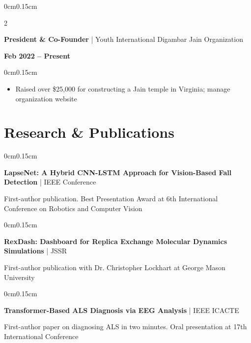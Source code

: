 \documentclass[10pt, letterpaper]{article}
\newenvironment{highlights}{
    \begin{itemize}[topsep=0pt, parsep=0pt, partopsep=0pt, itemsep=0pt, leftmargin=0.4cm]
}{
    \end{itemize}
}
\newenvironment{onecolentry}{
    \begin{adjustwidth}{0cm}{0.15cm}
}{
    \end{adjustwidth}
}
\newenvironment{twocolentry}[2][]{
    \onecolentry
    \def\secondColumn{#2}
    \setcolumnwidth{\fill, 4cm}
    \begin{paracol}{2}
}{
    \switchcolumn \raggedleft \secondColumn
    \end{paracol}
    \endonecolentry
}
\begin{document}
    \vspace{0.05cm}

    \begin{twocolentry}{\textbf{Feb 2022 -- Present}}
        \textbf{President \& Co-Founder} | Youth International Digambar Jain Organization
    \end{twocolentry}

    \begin{onecolentry}
        \begin{highlights}
            \item Raised over \$25,000 for constructing a Jain temple in Virginia; manage organization website
        \end{highlights}
    \end{onecolentry}

    \vspace{0.05cm}
    \section{Research \& Publications}
    \vspace{0.05cm}

    \begin{onecolentry}
        \textbf{LapseNet: A Hybrid CNN-LSTM Approach for Vision-Based Fall Detection} | IEEE Conference
        
        \vspace{0.05cm}
        First-author publication. Best Presentation Award at 6th International Conference on Robotics and Computer Vision
    \end{onecolentry}

    \vspace{0.1cm}

    \begin{onecolentry}
        \textbf{RexDash: Dashboard for Replica Exchange Molecular Dynamics Simulations} | JSSR
        
        \vspace{0.05cm}
        First-author publication with Dr. Christopher Lockhart at George Mason University
    \end{onecolentry}

    \vspace{0.1cm}

    \begin{onecolentry}
        \textbf{Transformer-Based ALS Diagnosis via EEG Analysis} | IEEE ICACTE
        
        \vspace{0.05cm}
        First-author paper on diagnosing ALS in two minutes. Oral presentation at 17th International Conference
    \end{onecolentry}
\end{document}
